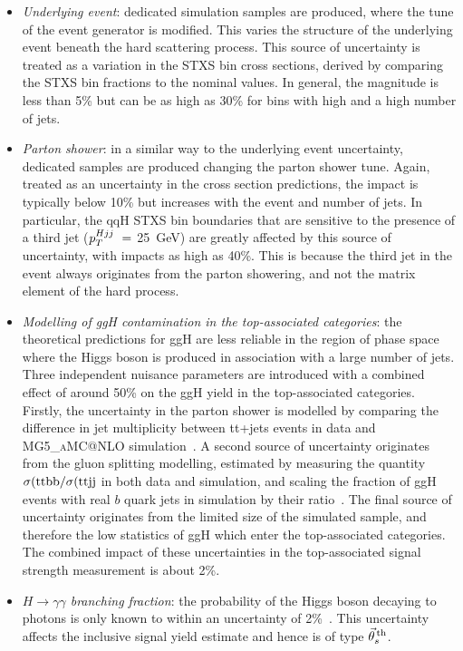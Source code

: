 \begin{itemize}
    \item \textit{Underlying event}: dedicated simulation samples are produced, where the tune of the event generator is modified. This varies the structure of the underlying event beneath the hard scattering process. This source of uncertainty is treated as a variation in the STXS bin cross sections, derived by comparing the STXS bin fractions to the nominal values. In general, the magnitude is less than 5\% but can be as high as 30\% for bins with high \pT and a high number of jets.
    
    \item \textit{Parton shower}: in a similar way to the underlying event uncertainty, dedicated samples are produced changing the parton shower tune. Again, treated as an uncertainty in the cross section predictions, the impact is typically below 10\% but increases with the event \pt and number of jets. In particular, the qqH STXS bin boundaries that are sensitive to the presence of a third jet ($p_T^{Hjj}~=~$25~GeV) are greatly affected by this source of uncertainty, with impacts as high as 40\%. This is because the third jet in the event always originates from the parton showering, and not the matrix element of the hard process.
    
    \item \textit{Modelling of ggH contamination in the top-associated categories}: the theoretical predictions for ggH are less reliable in the region of phase space where the Higgs boson is produced in association with a large number of jets. Three independent nuisance parameters are introduced with a combined effect of around 50\% on the ggH yield in the top-associated categories. Firstly, the uncertainty in the parton shower is modelled by comparing the difference in jet multiplicity between tt+jets events in data and \textsc{MG5\_aMC@NLO} simulation~\cite{Sirunyan:2018ucr}. A second source of uncertainty originates from the gluon splitting modelling, estimated by measuring the quantity $\sigma({\rm{ttbb}}/\sigma({\rm{ttjj}}$ in both data and simulation, and scaling the fraction of ggH events with real $b$ quark jets in simulation by their ratio~\cite{CMS-PAS-TOP-16-010}. The final source of uncertainty originates from the limited size of the simulated sample, and therefore the low statistics of ggH which enter the top-associated categories. The combined impact of these uncertainties in the top-associated signal strength measurement is about 2\%.
    
    \item \textit{$H\rightarrow\gamma\gamma$ branching fraction}: the probability of the Higgs boson decaying to photons is only known to within an uncertainty of 2\%~\cite{deFlorian:2016spz}. This uncertainty affects the inclusive signal yield estimate and hence is of type $\vec{\theta}^{\,\rm{th}}_{s}$.
\end{itemize}

